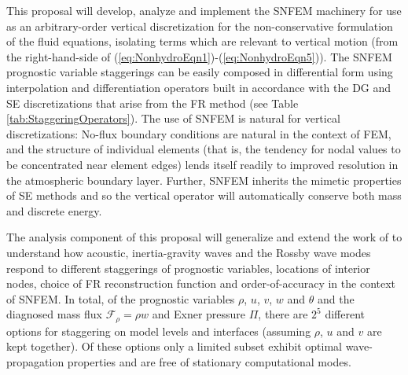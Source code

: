\documentclass[11pt]{article}
\begin{document}
This proposal will develop, analyze and implement the SNFEM machinery for use as an arbitrary-order vertical discretization for the non-conservative formulation of the fluid equations, isolating terms which are relevant to vertical motion (from the right-hand-side of (\ref{eq:NonhydroEqn1})-(\ref{eq:NonhydroEqn5})).  The SNFEM prognostic variable staggerings can be easily composed in differential form using interpolation and differentiation operators built in accordance with the DG and SE discretizations that arise from the FR method (see Table \ref{tab:StaggeringOperators}).  The use of SNFEM is natural for vertical discretizations:  No-flux boundary conditions are natural in the context of FEM, and the structure of individual elements (that is, the tendency for nodal values to be concentrated near element edges) lends itself readily to improved resolution in the atmospheric boundary layer.  Further, SNFEM inherits the mimetic properties of SE methods and so the vertical operator will automatically conserve both mass and discrete energy.

The analysis component of this proposal will generalize and extend the work of \cite{JTTJW2005JCP} to understand how acoustic, inertia-gravity waves and the Rossby wave modes respond to different staggerings of prognostic variables, locations of interior nodes, choice of FR reconstruction function and order-of-accuracy in the context of SNFEM.  In total, of the prognostic variables $\rho$, $u$, $v$, $w$ and $\theta$ and the diagnosed mass flux $\mathcal{F}_\rho = \rho w$ and Exner pressure $\Pi$, there are $2^5$ different options for staggering on model levels and interfaces (assuming $\rho$, $u$ and $v$ are kept together).  Of these options only a limited subset exhibit optimal wave-propagation properties and are free of stationary computational modes.



\end{document}
